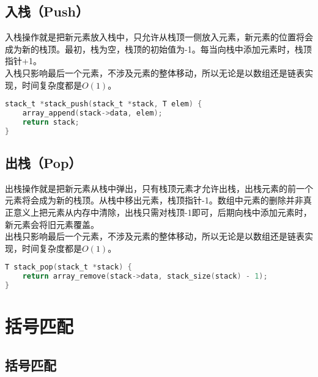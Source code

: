 \subsection{入栈（Push）}

入栈操作就是把新元素放入栈中，只允许从栈顶一侧放入元素，新元素的位置将会成为新的栈顶。最初，栈为空，栈顶的初始值为-1。每当向栈中添加元素时，栈顶指针+1。\\

入栈只影响最后一个元素，不涉及元素的整体移动，所以无论是以数组还是链表实现，时间复杂度都是$ O(1) $。\\


\begin{lstlisting}[language=C]
stack_t *stack_push(stack_t *stack, T elem) {
	array_append(stack->data, elem);
	return stack;
}
\end{lstlisting}

\vspace{0.5cm}

\subsection{出栈（Pop）}

出栈操作就是把新元素从栈中弹出，只有栈顶元素才允许出栈，出栈元素的前一个元素将会成为新的栈顶。从栈中移出元素，栈顶指针-1。数组中元素的删除并非真正意义上把元素从内存中清除，出栈只需对栈顶-1即可，后期向栈中添加元素时，新元素会将旧元素覆盖。\\

出栈只影响最后一个元素，不涉及元素的整体移动，所以无论是以数组还是链表实现，时间复杂度都是$ O(1) $。\\


\begin{lstlisting}[language=C]
T stack_pop(stack_t *stack) {
	return array_remove(stack->data, stack_size(stack) - 1);
}
\end{lstlisting}

\newpage

\section{括号匹配}

\subsection{括号匹配}

